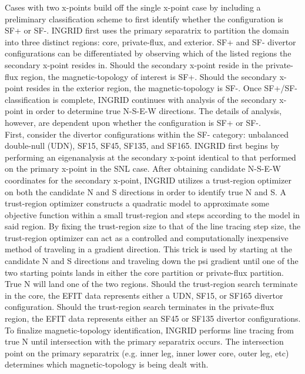 Cases with two x-points build off the single x-point case by including a preliminary classification scheme to first identify whether the configuration is SF+ or SF-. INGRID first uses the primary separatrix to partition the domain into three distinct regions: core, private-flux, and exterior. SF+ and SF- divertor configurations can be differentiated by observing which of the listed regions the secondary x-point resides in. Should the secondary x-point reside in the private-flux region, the magnetic-topology of interest is SF+. Should the secondary x-point resides in the exterior region, the magnetic-topology is SF-. Once SF+/SF- classification is complete, INGRID continues with analysis of the secondary x-point in order to determine true N-S-E-W directions. The details of analysis, however, are dependent upon whether the configuration is SF+ or SF-.\\ \indent
First, consider the divertor configurations within the SF- category: unbalanced double-null (UDN), SF15, SF45, SF135, and SF165. INGRID first begins by performing an eigenanalysis at the secondary x-point identical to that performed on the primary x-point in the SNL case. After obtaining candidate N-S-E-W coordinates for the secondary x-point, INGRID utilizes a trust-region optimizer on both the candidate N and S directions in order to identify true N and S. A trust-region optimizer constructs a quadratic model to approximate some objective function within a small trust-region and steps according to the model in said region. By fixing the trust-region size to that of the line tracing step size, the trust-region optimizer can act as a controlled and computationally inexpensive method of traveling in a gradient direction. This trick is used by starting at the candidate N and S directions and traveling down the psi gradient until one of the two starting points lands in either the core partition or private-flux partition. True N will land one of the two regions. Should the trust-region search terminate in the core, the EFIT data represents either a UDN, SF15, or SF165 divertor configuration. Should the trust-region search terminates in the private-flux region, the EFIT data represents either an SF45 or SF135 divertor configurations. To finalize magnetic-topology identification, INGRID performs line tracing from true N until intersection with the primary separatrix occurs. The intersection point on the primary separatrix (e.g. inner leg, inner lower core, outer leg, etc)  determines which magnetic-topology is being dealt with.\\ \indent
